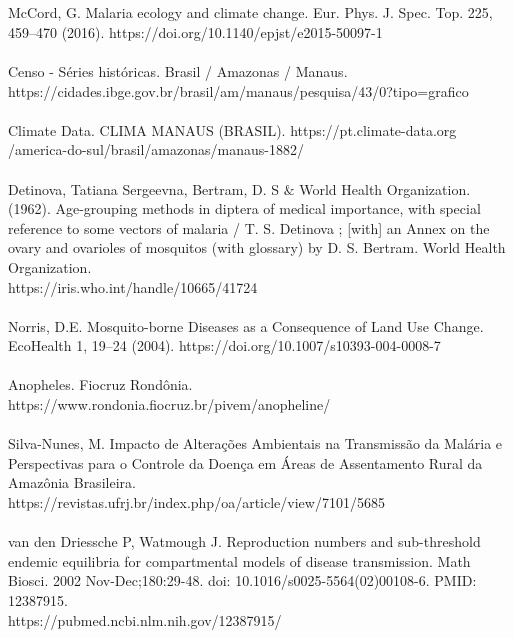\documentclass[12pt]{article}
\begin{document}
\\\\
\noindent [9] McCord, G. Malaria ecology and climate change. Eur. Phys. J. Spec. Top. 225, 459–470 (2016). https://doi.org/10.1140/epjst/e2015-50097-1
\\\\
\noindent [10] Censo - Séries históricas. Brasil / Amazonas / Manaus. 
\\https://cidades.ibge.gov.br/brasil/am/manaus/pesquisa/43/0?tipo=grafico
\\\\
\noindent [11] Climate Data. CLIMA MANAUS (BRASIL). https://pt.climate-data.org \\ /america-do-sul/brasil/amazonas/manaus-1882/
\\\\
\noindent [12] Detinova, Tatiana Sergeevna, Bertram, D. S $\&$ World Health Organization. (1962). Age-grouping methods in diptera of medical importance, with special reference to some vectors of malaria / T. S. Detinova ; [with] an Annex on the ovary and ovarioles of mosquitos (with glossary) by D. S. Bertram. World Health Organization. \\ https://iris.who.int/handle/10665/41724
\\\\
\noindent [13] Norris, D.E. Mosquito-borne Diseases as a Consequence of Land Use Change. EcoHealth 1, 19–24 (2004). https://doi.org/10.1007/s10393-004-0008-7
\\\\
\noindent [14] Anopheles. Fiocruz Rondônia. \\ https://www.rondonia.fiocruz.br/pivem/anopheline/
\\\\
\noindent [15] Silva-Nunes, M. Impacto de Alterações Ambientais na Transmissão da Malária e Perspectivas para o Controle da Doença em Áreas de Assentamento Rural da Amazônia Brasileira. \\ https://revistas.ufrj.br/index.php/oa/article/view/7101/5685
\\\\
\noindent [16] van den Driessche P, Watmough J. Reproduction numbers and sub-threshold endemic equilibria for compartmental models of disease transmission. Math Biosci. 2002 Nov-Dec;180:29-48. doi: 10.1016/s0025-5564(02)00108-6. PMID: 12387915. \\ 
https://pubmed.ncbi.nlm.nih.gov/12387915/


\end{document}

